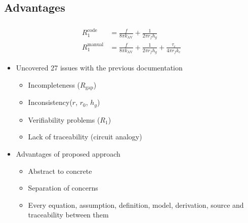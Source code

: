 \documentclass{beamer}
\begin{document}

\subsection[Advantages]{Advantages}


\begin{frame}[fragile]

\frametitle{\citet{SmithAndKoothoor2016}}

\begin{align}
R_1^{\mathrm{code}} &= \frac{f}{8\pi k_{\mathrm{AV}}} + \frac{1}{2\pi r_f h_g} \\
 R_1^{\mathrm{manual}} & = \frac {f}{8 \pi k_{\mathrm{AV}}}+ \frac{1}{2\pi r_f h_g}+\frac{\tau_c}{4\pi r_f k_c}
\end{align}

 
\begin{itemize}
\item Uncovered 27 issues with the previous documentation
\begin{itemize}
\item Incompleteness ($R_{\mbox{gap}}$)
\item Inconsistency($r$, $r_0$, $h_g$)
\item Verifiability problems ($R_1$)
\item Lack of traceability (circuit analogy)
\end{itemize}
\item Advantages of proposed approach
\begin{itemize}
\item Abstract to concrete
\item Separation of concerns
\item Every equation, assumption, definition, model, derivation, source and
  traceability between them
\end{itemize}
\end{itemize}

\end{frame}

\end{document}
